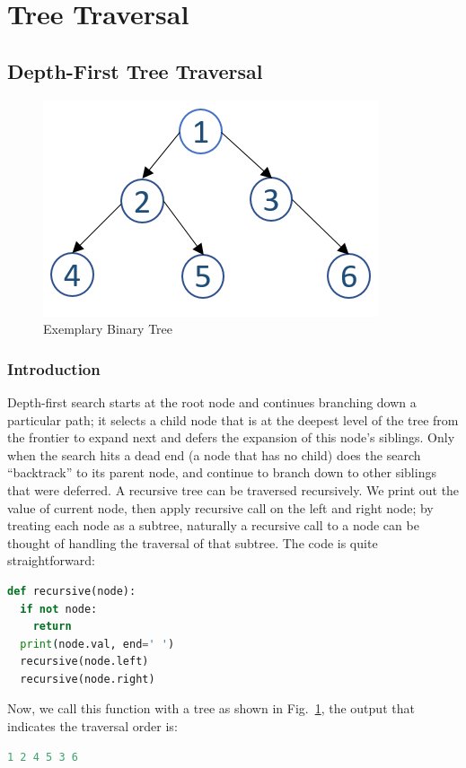 \documentclass[../main.tex]{subfiles}
\begin{document}
\section{Tree Traversal}
\subsection{Depth-First Tree Traversal}
\begin{figure}[H]
    \centering
    \includegraphics[width = .45\columnwidth]{fig/binary_tree_example.png}
    \caption{Exemplary Binary Tree }
    \label{fig:binary_tree_traversal_example}
\end{figure}
\subsubsection{Introduction}
Depth-first search starts at the root node and continues branching down a particular path; it selects a child node that is at the deepest level of the tree from the frontier to expand next and defers the expansion of this node's siblings. Only when the search hits a dead end (a node that has no child) does the search ``backtrack'' to its parent node, and continue to branch down to  other siblings that were deferred. A recursive tree can be traversed recursively. We print out the value of current node, then apply recursive call on the left and right node; by treating each node as a subtree, naturally a  recursive call to a  node can be  thought of handling the traversal of that subtree. The code is quite straightforward:

\begin{lstlisting}[language=Python]
def recursive(node):
  if not node:
    return
  print(node.val, end=' ')
  recursive(node.left)
  recursive(node.right)
\end{lstlisting}
Now, we call this function with a tree as shown in Fig.~\ref{fig:binary_tree_traversal_example}, the output that indicates the traversal order is:
\begin{lstlisting}[language=Python]
1 2 4 5 3 6 
\end{lstlisting}
\end{document}

